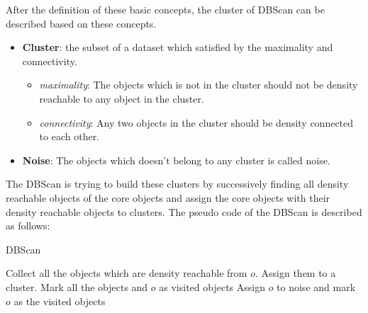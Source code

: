 After the definition of these basic concepts, the cluster of DBScan can be described based on these concepts. 
\begin{itemize}
\item \textbf{Cluster}: the subset of a dataset which satisfied by the maximality and connectivity.
\begin{itemize}
\item \emph{maximality}:  The objects which is not in the cluster should not be density reachable to any object in the cluster.
\item \emph{connectivity}: Any two objects in the cluster should be density connected to each other.
\end{itemize}
\item \textbf{Noise}: The objects which doesn't belong to any cluster is called noise.
\end{itemize}
The DBScan is trying to build these clusters by successively finding all density reachable objects of the core objects and assign the core objects with their density reachable objects to clusters. The pseudo code of the DBScan is described as follows:
\begin{algorithm}
\caption{DBScan}
\begin{algorithmic}
\STATE Collect all the objects which are density reachable from $o$. Assign them to a cluster.
\STATE Mark all the objects and $o$ as visited objects
\ELSE
\STATE Assign $o$ to noise and mark $o$ as the visited objects
\ENDIF
\ENDIF
\ENDFOR
\end{algorithmic}
\end{algorithm}

